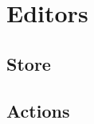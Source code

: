 \section{Editors}
\label{sec:f-editors}

\subsection{Store}
\label{ssec:fe-store}

\subsection{Actions}
\label{ssec:fe-actions}
